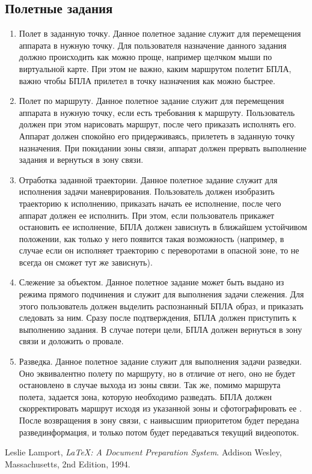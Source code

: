 \documentclass[utf8]{report}
\begin{document}
\subsection{Полетные задания}
\begin{enumerate}
  \item Полет в заданную точку. Данное полетное задание служит для перемещения аппарата в нужную точку. Для пользователя назначение данного задания должно происходить как можно проще, например щелчком мыши по виртуальной карте. При этом не важно, каким маршрутом полетит БПЛА, важно чтобы БПЛА прилетел в точку назначения как можно быстрее.
  \item Полет по маршруту. Данное полетное задание служит для перемещения аппарата в нужную точку, если есть требования к маршруту. Пользователь должен при этом нарисовать маршрут, после чего приказать исполнять его. Аппарат должен спокойно его придерживаясь, прилететь в заданную точку назначения. При покидании зоны связи, аппарат должен прервать выполнение задания и вернуться в зону связи.
  \item Отработка заданной траектории. Данное полетное задание служит для исполнения задачи маневрирования. Пользователь должен изобразить траекторию к исполнению, приказать начать ее исполнение, после чего аппарат должен ее исполнить. При этом, если пользователь прикажет остановить ее исполнение, БПЛА должен зависнуть в ближайшем устойчивом положении, как только у него появится такая возможность (например, в случае если он исполняет траекторию с переворотами в опасной зоне, то не всегда он сможет тут же зависнуть).
  \item Слежение за объектом. Данное полетное задание может быть выдано из режима прямого подчинения и служит для выполнения задачи слежения. Для этого пользователь должен выделить распознанный БПЛА образ, и приказать следовать за ним. Сразу после подтверждения, БПЛА должен приступить к выполнению задания. В случае потери цели, БПЛА должен вернуться в зону связи и доложить о провале.
  \item Разведка. Данное полетное задание служит для выполнения задачи разведки. Оно эквивалентно полету по маршруту, но в отличие от него, оно не будет остановлено в случае выхода из зоны связи. Так же, помимо маршрута полета, задается зона, которую необходимо разведать. БПЛА должен скорректировать маршрут исходя из указанной зоны и сфотографировать ее . После возвращения в зону связи, с наивысшим приоритетом будет передана развединформация, и только потом будет передаваться текущий видеопоток.
\end{enumerate}

\begin{thebibliography}{9}
      Leslie Lamport,
      \emph{\LaTeX: A Document Preparation System}.
      Addison Wesley, Massachusetts,
      2nd Edition,
      1994.
 
\end{thebibliography}
 
\end{document}

